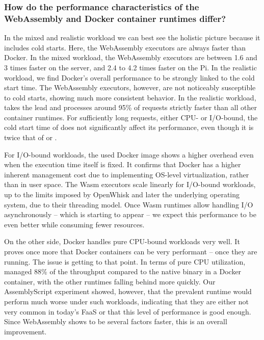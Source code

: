 \subsubsection*{How do the performance characteristics of the WebAssembly and Docker container runtimes differ?}

In the mixed and realistic workload we can best see the holistic picture because it includes cold starts. Here, the WebAssembly executors are always faster than Docker. In the mixed workload, the WebAssembly executors are between 1.6 and 3 times faster on the server, and 2.4 to 4.2 times faster on the Pi. In the realistic workload, we find Docker's overall performance to be strongly linked to the cold start time. The WebAssembly executors, however, are not noticeably susceptible to cold starts, showing much more consistent behavior. In the realistic workload,  takes the lead and processes around 95\% of requests strictly faster than all other container runtimes. For sufficiently long requests, either CPU- or I/O-bound, the cold start time of  does not significantly affect its performance, even though it is twice that of  or .

For I/O-bound workloads, the used Docker image shows a higher overhead even when the execution time itself is fixed. It confirms that Docker has a higher inherent management cost due to implementing OS-level virtualization, rather than in user space.
The Wasm executors scale linearly for I/O-bound workloads, up to the limits imposed by OpenWhisk and later the underlying operating system, due to their threading model. Once Wasm runtimes allow handling I/O asynchronously -- which is starting to appear -- we expect this performance to be even better while consuming fewer resources.

On the other side, Docker handles pure CPU-bound workloads very well. It proves once more that Docker containers can be very performant -- once they are running. The issue is getting to that point.
In terms of pure CPU utilization,  managed 88\% of the throughput compared to the native binary in a Docker container, with the other runtimes falling behind more quickly. Our AssemblyScript experiment showed, however, that the prevalent  runtime would perform much worse under such workloads, indicating that they are either not very common in today's FaaS or that this level of performance is good enough. Since WebAssembly shows to be several factors faster, this is an overall improvement.

